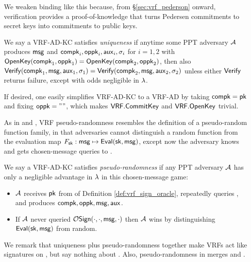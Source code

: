 We weaken binding like this because, from \S\ref{sec:vrf_pederson}
onward, verification provides a proof-of-knowledge that turns
Pedersen commitments to secret keys into commitments to public keys.

\begin{definition}
We say a VRF-AD-KC satisfies {\em uniqueness} if anytime some PPT adversary $\mathcal{A}$
produces $\mathsf{msg}$ and $\mathsf{compk}_i,\mathsf{oppk}_i,\mathsf{aux}_i,\sigma_i$ for $i=1,2$
 with ${\mathsf{OpenKey}}(\mathsf{compk}_1,\mathsf{oppk}_1) = {\mathsf{OpenKey}}(\mathsf{compk}_2,\mathsf{oppk}_2)$, then also
${\mathsf{Verify}}(\mathsf{compk}_1,\mathsf{msg},\mathsf{aux}_1,\sigma_1) = {\mathsf{Verify}}(\mathsf{compk}_2,\mathsf{msg},\mathsf{aux}_2,\sigma_2)$
unless either ${\mathsf{Verify}}$ returns failure,
except with odds negligible in $\lambda$.
\end{definition}

If desired, one easily simplifies VRF-AD-KC to a VRF-AD by
 taking $\mathsf{compk} = \mathsf{pk}$ and fixing $\mathsf{oppk} = \mathtt{""}$,
 which makes ${\mathsf{VRF}}.{\mathsf{CommitKey}}$ and ${\mathsf{VRF}}.{\mathsf{OpenKey}}$ trivial.

As in \cite{vrf_micali} and \cite{agg_dkg}, VRF pseudo-randomness
resembles the definition of a pseudo-random function family, in that
adversaries cannot distinguish a random function from the evaluation
map $F_\mathsf{sk} : \mathsf{msg} \mapsto {\ensuremath{\mathsf{Eval}}}(\mathsf{sk},\mathsf{msg})$,
except now the adversary knows \pk and gets chosen-message queries to \Sign.

\begin{definition}
We say a VRF-AD-KC satisfies {\em pseudo-randomness} if 
any PPT adversary $\mathcal{A}$ has only a negligible advantage in $\lambda$
in this chosen-message game:
\begin{itemize}
 \item $\mathcal{A}$ receives $\mathsf{pk}$ from  of Definition \ref{def:vrf_sign_oracle},
  repeatedly queries , and produces $\mathsf{compk},\mathsf{oppk},\mathsf{msg},\mathsf{aux}$. 
 \item If $\mathcal{A}$ never queried $\mathcal{O}\mathsf{Sign}(\cdot,\cdot,\mathsf{msg},\cdot)$ then
  $\mathcal{A}$ wins by distinguishing ${\mathsf{Eval}}(\mathsf{sk},\mathsf{msg})$ from random.
\end{itemize}
\end{definition}

We remark that uniqueness plus pseudo-randomness together make VRFs 
act like signatures on \msg, but say nothing about \aux.
Also, pseudo-randomness in \cite{vrf_micali} merges \Eval and \Sign.

